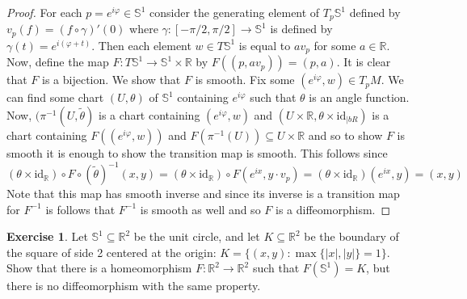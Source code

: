 \documentclass{article}
\newcommand{\bR}{\mathbb{R}}
\newcommand{\vp}{\varphi}
\newcommand{\bS}{\mathbb{S}}
\theoremstyle{definition}
\newtheorem{exercise}{Exercise}
\begin{document}
\begin{proof}
    For each $p=e^{i \vp}\in \bS^1$ consider the generating element of $T_p \bS^1$ defined by $v_p(f) = (f \circ \gamma)'(0)$ where $\gamma: [-\pi/2, \pi/2] \to \bS^1$ is defined by $\gamma(t) = e^{i(\vp + t)}$. Then each element $w \in T\bS^1$ is equal to $av_p$ for some $a \in \bR$. Now, define the map $F: T\bS^1 \to \bS^1\times \bR$ by $F( (p, av_p)) = (p, a)$. It is clear that $F$ is a bijection.  We show that $F$ is smooth. Fix some $(e^{i \vp}, w) \in T_p M$. We can find some chart $(U, \theta)$ of $\bS^1$ containing $e^{i \vp}$ such that $\theta$ is an angle function. Now, $(\pi^{-1}(U, \tilde{\theta})$ is a chart containing $(e^{i\vp}, w)$ and $(U \times \bR, \theta \times \text{id}_{|bR})$ is a chart containing $F((e^{i\vp}, w))$ and $F(\pi^{-1}(U)) \subseteq U \times \bR$ and so to show $F$ is smooth it is enough to show the transition map is smooth. This follows since 
    \[ (\theta \times \text{id}_{\bR}) \circ F \circ (\tilde{\theta})^{-1}(x, y) = (\theta \times \text{id}_{\bR}) \circ F(e^{ix}, y \cdot v_p) = (\theta \times \text{id}_{\bR})(e^{ix}, y) = (x,y) \] 
    Note that this map has smooth inverse and since its inverse is a transition map for $F^{-1}$ is follows that $F^{-1}$ is smooth as well and so $F$ is a diffeomorphism. 
\end{proof}

\begin{exercise}
    Let $\bS^1 \subseteq \bR^2$ be the unit circle, and let $K \subseteq \bR^2$ be the boundary of the square of side 2 centered at the origin: $K = \{(x,y) \colon \max\{|x|, |y|\} = 1\}$. Show that there is a homeomorphism $F: \bR^2 \to \bR^2$ such that $F(\bS^1) = K$, but there is no diffeomorphism with the same property.  
\end{exercise}
\end{document}
